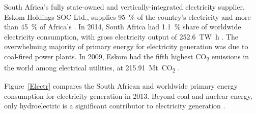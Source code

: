 South Africa's fully state-owned and vertically-integrated electricity supplier, Eskom Holdings SOC Ltd., supplies \SI{95}{\percent} of the country's electricity and more than \SI{45}{\percent} of Africa's \cite{EskomGenerationDivision2014}. In 2014, South Africa had \SI{1.1}{\percent} share of worldwide electricity consumption, with gross electricity output of \SI{252.6}{\tera\watt\hour} \cite{BP2015c}.
The overwhelming majority of primary energy for electricity generation was due to coal-fired power plants. In 2009, Eskom had the fifth highest CO\textsubscript{2} emissions in the world among electrical utilities, at \SI{215.91}{\mega\tonne}~CO\textsubscript{2} \cite{CARMA2015}.


Figure~\ref{Electr} compares the South African and worldwide primary energy consumption for electricity generation in 2013. Beyond coal and nuclear energy, only hydroelectric is a significant contributor to electricity generation \cite{Agency2015}.

